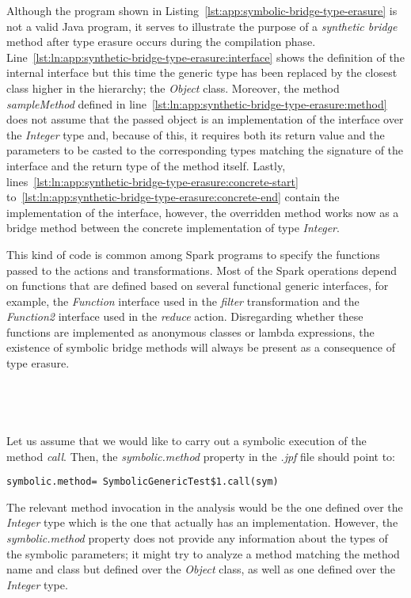 Although the program shown in Listing~\ref{lst:app:symbolic-bridge-type-erasure} is not a valid Java program, it serves to illustrate the purpose of a \textit{synthetic bridge} method after type erasure occurs during the compilation phase. Line~\ref{lst:ln:app:synthetic-bridge-type-erasure:interface} shows the definition of the internal interface but this time the generic type has been replaced by the closest class higher in the hierarchy; the \textit{Object} class. Moreover, the method \textit{sampleMethod} defined in line~\ref{lst:ln:app:synthetic-bridge-type-erasure:method} does not assume that the passed object is an implementation of the interface over the \textit{Integer} type and, because of this, it requires both its return value and the parameters to be casted to the corresponding types matching the signature of the interface and the return type of the method itself. Lastly, lines~\ref{lst:ln:app:synthetic-bridge-type-erasure:concrete-start} to~\ref{lst:ln:app:synthetic-bridge-type-erasure:concrete-end} contain the implementation of the interface, however, the overridden method works now as a bridge method between the concrete implementation of type \textit{Integer}. 

This kind of code is common among Spark programs to specify the functions passed to the actions and transformations. Most of the Spark operations depend on functions that are defined based on several functional generic interfaces, for example, the \textit{Function} interface used in the \textit{filter} transformation and the \textit{Function2} interface used in the \textit{reduce} action. Disregarding whether these functions are implemented as anonymous classes or lambda expressions, the existence of symbolic bridge methods will always be present as a consequence of type erasure.
\\ \\ \\ \\ \\
Let us assume that we would like \spf{} to carry out a symbolic execution of the method \textit{call}. Then, the \textit{symbolic.method} property in the \textit{.jpf} file should point to:

\hspace*{1cm} \texttt{symbolic.method= SymbolicGenericTest\$1.call(sym)}

The relevant method invocation in the analysis would be the one defined over the \textit{Integer} type which is the one that actually has an implementation. However, the \textit{symbolic.method} property does not provide any information about the types of the symbolic parameters; it might try to analyze a method matching the method name and class but defined over the \textit{Object} class, as well as one defined over the \textit{Integer} type.

